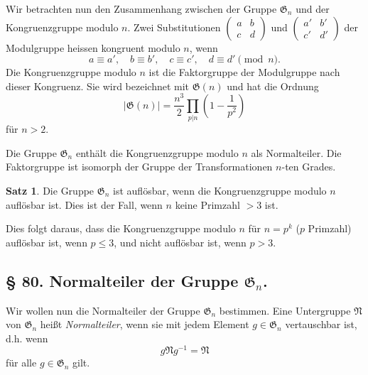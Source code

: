 \documentclass[12pt,a4paper]{article}
\theoremstyle{definition}
\newtheorem*{satz}{Satz}
\begin{document}
Wir betrachten nun den Zusammenhang zwischen der Gruppe
$\mathfrak{G}_n$ und der Kongruenzgruppe modulo $n$. Zwei Substitutionen
$\begin{pmatrix} a & b \\ c & d \end{pmatrix}$ und $\begin{pmatrix} a' & b' \\ c' & d' \end{pmatrix}$ der Modulgruppe
heissen kongruent modulo $n$, wenn
\begin{equation}\tag{6}
a \equiv a', \quad b \equiv b', \quad c \equiv c', \quad d \equiv d' \pmod{n}.
\end{equation}
Die Kongruenzgruppe modulo $n$ ist die Faktorgruppe der
Modulgruppe nach dieser Kongruenz. Sie wird bezeichnet mit
$\mathfrak{G}(n)$ und hat die Ordnung
\begin{equation}\tag{7}
|\mathfrak{G}(n)| = \frac{n^3}{2} \prod_{p|n} \left(1 - \frac{1}{p^2}\right)
\end{equation}
f\"ur $n > 2$.

Die Gruppe $\mathfrak{G}_n$ enth\"alt die Kongruenzgruppe modulo $n$
als Normalteiler. Die Faktorgruppe ist isomorph der Gruppe
der Transformationen $n$-ten Grades.

\begin{satz}
Die Gruppe $\mathfrak{G}_n$ ist aufl\"osbar, wenn die Kongruenzgruppe
modulo $n$ aufl\"osbar ist. Dies ist der Fall, wenn $n$ keine
Primzahl $> 3$ ist.
\end{satz}

Dies folgt daraus, dass die Kongruenzgruppe modulo $n$ f\"ur
$n = p^k$ ($p$ Primzahl) aufl\"osbar ist, wenn $p \leq 3$, und nicht
aufl\"osbar ist, wenn $p > 3$.

\newpage
\subsection*{\S{} 80. Normalteiler der Gruppe $\mathfrak{G}_n$.}

Wir wollen nun die Normalteiler der Gruppe $\mathfrak{G}_n$ bestimmen.
Eine Untergruppe $\mathfrak{N}$ von $\mathfrak{G}_n$ hei\ss t \textit{Normalteiler}, wenn sie
mit jedem Element $g \in \mathfrak{G}_n$ vertauschbar ist, d.h. wenn
\begin{equation}\tag{1}
g\mathfrak{N}g^{-1} = \mathfrak{N}
\end{equation}
f\"ur alle $g \in \mathfrak{G}_n$ gilt.
\end{document}
